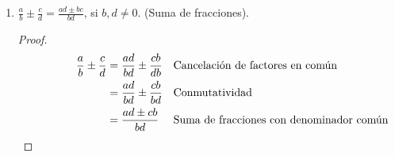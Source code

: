 \documentclass[11pt]{article}
\begin{document}
\begin{enumerate}[label=\alph*)]
    \item $\frac{a}{b} \pm \frac{c}{d} = \frac{ad \pm bc}{bd} $, si $b, d \neq 0$. (Suma de fracciones).
    \vspace{-1em}
    \begin{proof} 
    \begin{align*} \qquad \ \qquad
    \frac{a}{b} \pm \frac{c}{d} &= \frac{ad}{bd} \pm \frac{cb}{db} && \text{Cancelación de factores en común}\\
    &= \frac{ad}{bd} \pm \frac{cb}{bd} && \text{Conmutatividad}\\
    &= \frac{ad \pm cb}{bd} && \text{Suma de fracciones con denominador común} \qedhere
    \end{align*}
    \end{proof} \vspace{-1em}

\end{enumerate}
\end{document}
